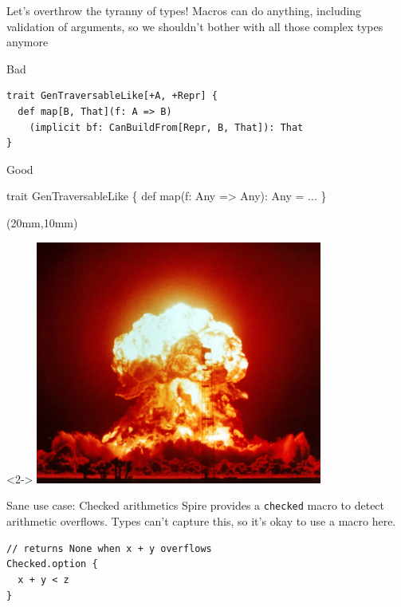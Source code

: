 \documentclass{beamer}
\begin{document}
\begin{frame}[fragile]{Let's overthrow the tyranny of types!}
  Macros can do anything, including validation of arguments,
  so we shouldn't bother with all those complex types anymore

  \vspace{1em}
  \begin{alertblock}{Bad}
  \begin{verbatim}
trait GenTraversableLike[+A, +Repr] {
  def map[B, That](f: A => B)
    (implicit bf: CanBuildFrom[Repr, B, That]): That
}\end{verbatim}
  \end{alertblock}

  \begin{exampleblock}{Good}
  \begin{semiverbatim}
trait GenTraversableLike \{
  def map(f: Any => Any): Any = \text{\color{blue}{macro}} ...
\}
  \end{semiverbatim}
  \end{exampleblock}

  \begin{textblock*}{\textwidth}(20mm,10mm)
    \begin{visibleenv}<2->
      \includegraphics[height=8cm]{img/boom.jpg}
    \end{visibleenv}
  \end{textblock*}
\end{frame}

\begin{frame}[fragile]{Sane use case: Checked arithmetics}
  Spire provides a \texttt{checked} macro to detect arithmetic overflows.
  Types can't capture this, so it's okay to use a macro here.

  \vspace{1em}
  \begin{verbatim}
// returns None when x + y overflows
Checked.option {
  x + y < z
}
  \end{verbatim}
\end{frame}
\end{document}

